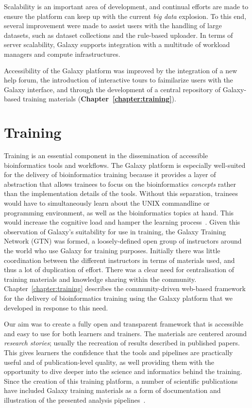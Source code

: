 Scalability is an important area of development, and continual efforts are made to ensure the platform can keep up with the current \emph{big data} explosion. To this end, several improvement were made to assist users with the handling of large datasets, such as dataset collections and the rule-based uploader. In terms of server scalability, Galaxy supports integration with a multitude of workload managers and compute infrastructures.

Accessibility of the Galaxy platform was improved by the integration of a new help forum, the introduction of interactive tours to faimilarize users with the Galaxy interface, and through the development of a central repository of Galaxy-based training materials (\textbf{Chapter~\ref{chapter:training}}).


\section{Training}
Training is an essential component in the dissemination of accessible bioinformatics tools and workflows. The Galaxy platform is especially well-suited for the delivery of bioinformatics training because it provides a layer of abstraction that allows trainees to focus on the bioinformatics \emph{concepts} rather than the implementation details of the tools. Without this separation, trainees would have to simultaneously learn about the UNIX commandline or programming environment, as well as the bioinformatics topics at hand. This would increase the cognitive load and hamper the learning process~\cite{paas2003cognitive}. Given this observation of Galaxy's suitability for use in training, the Galaxy Training Network (GTN) was formed, a loosely-defined open group of instructors around the world who use Galaxy for training purposes. Initially there was little coordination between the different instructors in terms of materials used, and thus a lot of duplication of effort. There was a clear need for centralisation of training materials and knowledge sharing within the community. Chapter~\ref{chapter:training} describes the community-driven web-based framework for the delivery of bioinformatics training using the Galaxy platform that we developed in response to this need.

Our aim was to create a fully open and transparent framework that is accessible and easy to use for both learners and trainers. The materials are centered around \emph{research stories}; usually the recreation of results described in published papers. This gives learners the confidence that the tools and pipelines are practically useful and of publication-level quality, as well providing them with the opportunity to dive deeper into the science and informatics behind the training. Since the creation of this training platform, a number of scientific publications have included Galaxy training materials as a form of documentation and illustration of the presented analysis pipelines~\cite{gruning2017rna,blank2018disseminating,batut2017asaim,hiltemann2018galaxy}.


